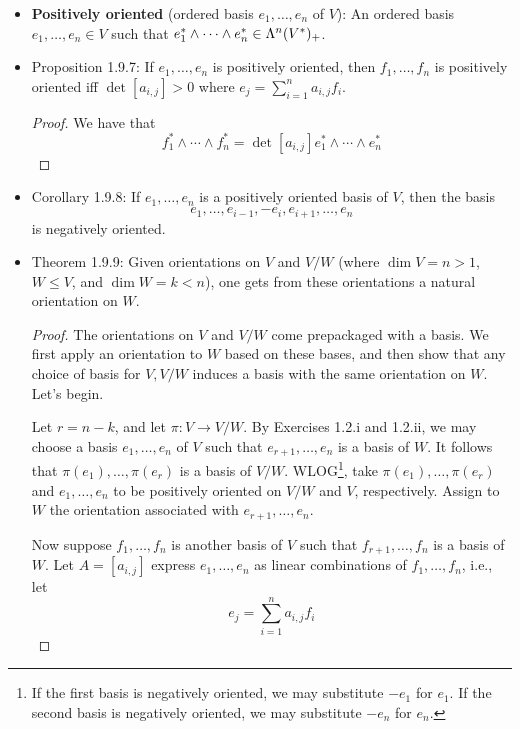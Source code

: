 \documentclass[../notes.tex]{subfiles}
\begin{document}
\begin{itemize}
    \item \textbf{Positively oriented} (ordered basis $e_1,\dots,e_n$ of $V$): An ordered basis $e_1,\dots,e_n\in V$ such that $e_1^*\wedge\cdots\wedge e_n^*\in\lam[n]{V^*}_+$.
    \item Proposition 1.9.7: If $e_1,\dots,e_n$ is positively oriented, then $f_1,\dots,f_n$ is positively oriented iff $\det[a_{i,j}]>0$ where $e_j=\sum_{i=1}^na_{i,j}f_i$.
    \begin{proof}
        We have that
        \begin{equation*}
            f_1^*\wedge\cdots\wedge f_n^* = \det[a_{i,j}]e_1^*\wedge\cdots\wedge e_n^*
        \end{equation*}
    \end{proof}
    \item Corollary 1.9.8: If $e_1,\dots,e_n$ is a positively oriented basis of $V$, then the basis
    \begin{equation*}
        e_1,\dots,e_{i-1},-e_i,e_{i+1},\dots,e_n
    \end{equation*}
    is negatively oriented.
    \item Theorem 1.9.9: Given orientations on $V$ and $V/W$ (where $\dim V=n>1$, $W\leq V$, and $\dim W=k<n$), one gets from these orientations a natural orientation on $W$.
    \begin{proof}
        The orientations on $V$ and $V/W$ come prepackaged with a basis. We first apply an orientation to $W$ based on these bases, and then show that any choice of basis for $V,V/W$ induces a basis with the same orientation on $W$. Let's begin.\par
        Let $r=n-k$, and let $\pi:V\to V/W$. By Exercises 1.2.i and 1.2.ii, we may choose a basis $e_1,\dots,e_n$ of $V$ such that $e_{r+1},\dots,e_n$ is a basis of $W$. It follows that $\pi(e_1),\dots,\pi(e_r)$ is a basis of $V/W$. WLOG\footnote{If the first basis is negatively oriented, we may substitute $-e_1$ for $e_1$. If the second basis is negatively oriented, we may substitute $-e_n$ for $e_n$.}, take $\pi(e_1),\dots,\pi(e_r)$ and $e_1,\dots,e_n$ to be positively oriented on $V/W$ and $V$, respectively. Assign to $W$ the orientation associated with $e_{r+1},\dots,e_n$.\par
        Now suppose $f_1,\dots,f_n$ is another basis of $V$ such that $f_{r+1},\dots,f_n$ is a basis of $W$. Let $A=[a_{i,j}]$ express $e_1,\dots,e_n$ as linear combinations of $f_1,\dots,f_n$, i.e., let
        \begin{equation*}
            e_j = \sum_{i=1}^na_{i,j}f_i

\end{equation*}
\end{proof}
\end{itemize}
\end{document}
